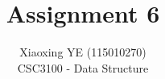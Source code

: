 \documentclass[12pt]{article}
\begin{document}
    
    \title{Assignment 6}
    \author{Xiaoxing YE (115010270)\\CSC3100 - Data Structure}
    
    \maketitle
    
    
    
\end{document}
